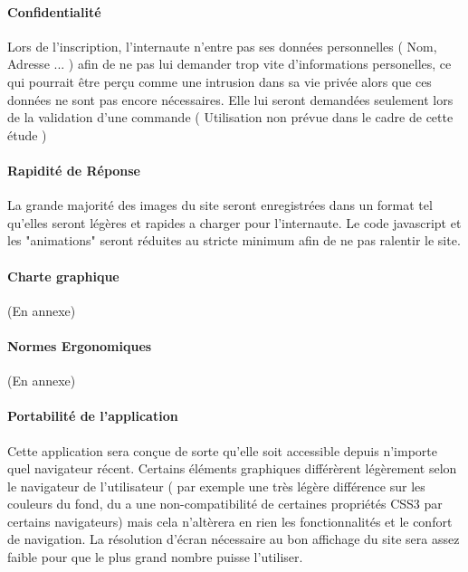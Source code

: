 \paragraph{Confidentialité}

Lors de l'inscription, l'internaute n'entre pas ses données personnelles ( Nom, Adresse ... ) afin de ne pas lui demander trop vite
d'informations personelles, ce qui pourrait être perçu comme une intrusion dans sa vie privée alors que ces données ne sont pas encore
nécessaires. Elle lui seront demandées seulement lors de la validation d'une commande ( Utilisation non prévue dans le cadre de cette étude )

\paragraph{Rapidité de Réponse}
	
La grande majorité des images du site seront enregistrées dans un format tel qu'elles seront légères et rapides a charger pour l'internaute.
Le code javascript et les "animations" seront réduites au stricte minimum afin de ne pas ralentir le site.

\paragraph{Charte graphique}

(En annexe)

\paragraph{Normes Ergonomiques}
	
(En annexe)

\paragraph{Portabilité de l'application}
	
Cette application sera conçue de sorte qu'elle soit accessible depuis n'importe quel navigateur récent. Certains éléments graphiques différèrent légèrement selon le navigateur de l'utilisateur ( par exemple une très légère différence sur les couleurs du fond, du a une non-compatibilité de certaines propriétés CSS3 par certains navigateurs) mais cela n'altèrera en rien les fonctionnalités et le confort de navigation.
La résolution d'écran nécessaire au bon affichage du site sera assez faible pour que le plus grand nombre puisse l'utiliser.

